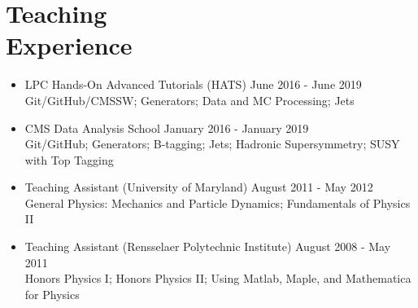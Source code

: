 \section{Teaching\\Experience}
\begin{itemize}[leftmargin=12pt]
\item LPC Hands-On Advanced Tutorials (HATS) \hfill June 2016 - June 2019\\
Git/GitHub/CMSSW; Generators; Data and MC Processing; Jets
\item CMS Data Analysis School \hfill January 2016 - January 2019\\
Git/GitHub; Generators; B-tagging; Jets; Hadronic Supersymmetry; SUSY with Top Tagging
\item Teaching Assistant (University of Maryland) \hfill August 2011 - May 2012\\
General Physics: Mechanics and Particle Dynamics; Fundamentals of Physics II
\item Teaching Assistant (Rensselaer Polytechnic Institute) \hfill August 2008 - May 2011\\
Honors Physics I; Honors Physics II; Using Matlab, Maple, and Mathematica for Physics
\end{itemize}